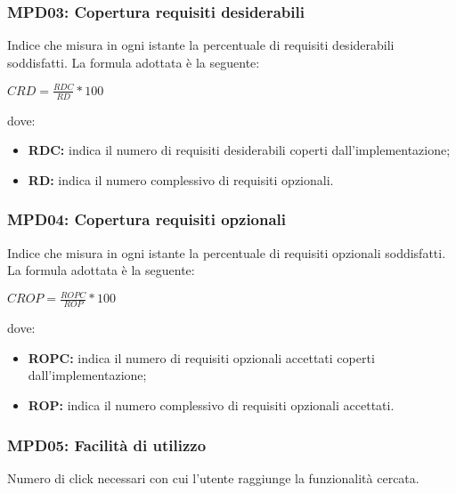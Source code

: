 \subsubsection{MPD03: Copertura requisiti desiderabili}\label{sssec:requisiti_desiderabili}
Indice che misura in ogni istante la percentuale di requisiti desiderabili soddisfatti.
La formula adottata è la seguente:
\begin{center}
    $CRD = \displaystyle \frac{RDC}{RD}*100$
\end{center}
dove:
\begin{itemize}
    \item \textbf{RDC:} indica il numero di requisiti desiderabili coperti dall'implementazione;
    \item \textbf{RD:} indica il numero complessivo di requisiti opzionali.
\end{itemize}

\subsubsection{MPD04: Copertura requisiti opzionali}\label{sssec:requisiti_opzionali}
Indice che misura in ogni istante la percentuale di requisiti opzionali soddisfatti.
La formula adottata è la seguente:
\begin{center}
    $CROP = \displaystyle \frac{ROPC}{ROP}*100$
\end{center}
dove:
\begin{itemize}
    \item \textbf{ROPC:} indica il numero di requisiti opzionali accettati coperti dall'implementazione;
    \item \textbf{ROP:} indica il numero complessivo di requisiti opzionali accettati.
\end{itemize}

\subsubsection{MPD05: Facilità di utilizzo}\label{sssec:facilita_utilizzo}
Numero di click necessari con cui l'utente raggiunge la funzionalità cercata.

